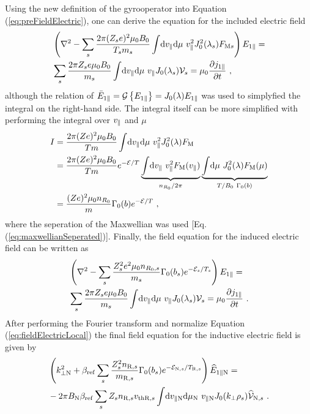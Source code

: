 Using the new definition of the gyrooperator into Equation (\ref{eq:preFieldElectric}), one can derive the equation for the included electric field 
\begin{gather}
    \begin{aligned}
        &\left(\nabla^2 - \sum_s \frac{2\pi (Z_se)^2 \mu_0 B_0}{T_sm_s}  \int \! \mathrm{d}v_\parallel\mathrm{d}\mu ~ v_\parallel^2 J_0^2(\lambda_s) F_{\mathrm{M}s} \right) E_{1\parallel} = \\
	    &\sum_s \frac{2\pi Z_se \mu_0 B_0}{m_s}  \int \! \mathrm{d}v_\parallel\mathrm{d}\mu ~ v_\parallel J_0(\lambda_s) \mathcal{V}_s = \mu_0 \frac{\partial j_{1\parallel}}{\partial t}~,
    \end{aligned}
	\label{eq:prefieldElectricLocal}
\end{gather}
although the relation of $\bar{E}_{1\parallel} = \mathcal{G} \left\{E_{1\parallel}\right\} = J_0(\lambda) E_{1\parallel}$ was used to simplyfied the integral on the right-hand side. The integral itself can be more simplified with performing the integral over $v_\parallel$ and $\mu$
\begin{gather}
	\begin{aligned}
		I &= \frac{2\pi (Ze)^2 \mu_0 B_0}{Tm}  \int \! \mathrm{d}v_\parallel\mathrm{d}\mu ~ v_\parallel^2 J_0^2(\lambda) F_\mathrm{M} \\
		  &= \frac{2\pi (Ze)^2 \mu_0 B_0}{Tm} e^{-\mathcal{E}/T} \underbrace{\int \! \mathrm{d}v_\parallel ~ v_\parallel^2 F_\mathrm{M}(v_\parallel)}_{n_{R_0}/2\pi} \underbrace{\int \! \mathrm{d}\mu ~ J_0^2(\lambda) F_\mathrm{M}(\mu)}_{T/B_0~\Gamma_0(b)} \\
		  &= \frac{(Ze)^2 \mu_0 n_{R_0}}{m} \Gamma_0(b) e^{-\mathcal{E}/T} ~,
	\end{aligned}
\end{gather}
where the seperation of the Maxwellian was used [Eq. (\ref{eq:maxwellianSeperated})]. Finally, the field equation for the induced electric field can be written as
\begin{gather}
    \begin{aligned}
        &\left(\nabla^2 - \sum_s \frac{Z_s^2e^2 \mu_0 n_{R_0,s}}{m_s} \Gamma_0(b_s) e^{-\mathcal{E}_s/T_s} \right) E_{1\parallel} = \\
	    &\sum_s \frac{2\pi Z_se \mu_0 B_0}{m_s}  \int \! \mathrm{d}v_\parallel\mathrm{d}\mu ~ v_\parallel J_0(\lambda_s) \mathcal{V}_s = \mu_0 \frac{\partial j_{1\parallel}}{\partial t}~.
    \end{aligned}
	\label{eq:fieldElectricLocal}
\end{gather}
After performing the Fourier transform and normalize Equation (\ref{eq:fieldElectricLocal}) the final field equation for the inductive electric field is given by
\begin{gather}
    \begin{aligned}
        &\left(k_{\perp \mathrm{N}}^2 + \beta_\mathrm{ref} \sum_s \frac{Z^2_sn_{\mathrm{R},s}}{m_{\mathrm{R},s}} \Gamma_0(b_s) e^{-\mathcal{E}_{\mathrm{N},s}/T_{\mathrm{R},s}} \right) \widehat{E}_{1\parallel \mathrm{N}} = \\
        &- 2\pi B_\mathrm{N} \beta_\mathrm{ref} \sum_s Z_s n_{\mathrm{R},s} v_{\mathrm{th}\mathrm{R},s} \int \! \mathrm{d}v_{\parallel \mathrm{N}} \mathrm{d}\mu_\mathrm{N} ~ v_{\parallel \mathrm{N}} J_0(k_\perp \rho_s) \widehat{\mathcal{V}}_{\mathrm{N},s} ~.
    \end{aligned}
    \label{eq:fieldElectricLocalNorm}
\end{gather}

